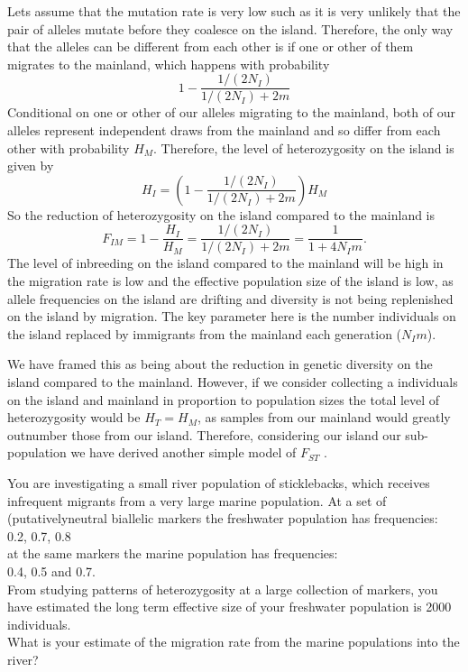 Lets assume that the mutation rate is very low such as it is very
unlikely that the pair of alleles mutate before they coalesce on the
island. Therefore, the only way that the alleles can be different from
each other is if one or other of them migrates to the mainland, which
happens with probability  
\begin{equation}
1 - \frac{1/(2N_I) }{1/(2N_I) + 2m}
\end{equation}
Conditional on one or other of our alleles migrating to the mainland,
both of our alleles represent independent draws from the mainland and
so differ from each other with probability $H_M$. Therefore, the level of
heterozygosity on the island is given by
\begin{equation}
H_I = (1 - \frac{1/(2N_I) }{1/(2N_I) + 2m})H_M
\end{equation}
So the reduction of heterozygosity on the island compared to the
mainland is
\begin{equation}
F_{IM} = 1- \frac{H_I}{H_M} = \frac{ 1/(2N_I) }{1/(2N_I) + 2m} = \frac{ 1 }{1 + 4N_Im}.
\end{equation}
The level of inbreeding on the island compared to the mainland will
be high in the migration rate is low and the effective population size
of the island is low, as allele frequencies on the island are drifting
and diversity is not being replenished on the island by migration. The
key parameter here is the number individuals on the island replaced by
immigrants from the mainland each generation ($N_I m$).

We have framed this as being about the reduction in genetic diversity on the
island compared to the mainland. However, if we consider collecting a
individuals on the island and mainland in proportion to population
sizes the total level of heterozygosity would be $H_T=H_M$, as samples
from our mainland would greatly outnumber those from our
island. Therefore, considering our island our sub-population we have
derived another simple model of $F_{ST}$ .

\begin{question}
You are investigating a small river population of sticklebacks, which receives infrequent migrants from a very large marine population. At a set of (putativelyneutral biallelic markers the freshwater population has frequencies:\\
0.2, 0.7, 0.8\\
at the same markers the marine population has frequencies:\\
0.4, 0.5 and 0.7.\\
 From studying patterns of heterozygosity at a large collection of markers, you have estimated the long term effective size of your freshwater population is 2000 individuals.\\
What is your estimate of the migration rate from the marine
populations into the river?
\end{question}
\newpage

